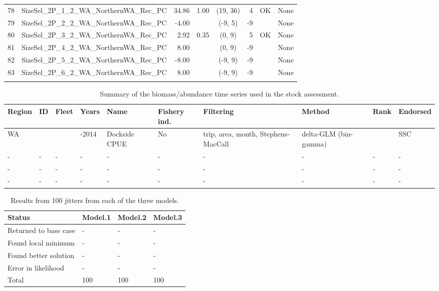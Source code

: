 \documentclass[12pt,]{article}
\begin{document}
\begin{landscape}
\begin{longtable}{rlrrcrcl}
  78 & SizeSel\_2P\_1\_2\_WA\_NorthernWA\_Rec\_PC & 34.86 & 1.00 & (19, 36) & 4 & OK & None \\ 
  79 & SizeSel\_2P\_2\_2\_WA\_NorthernWA\_Rec\_PC & -4.00 &  & (-9, 5) & -9 &  & None \\ 
  80 & SizeSel\_2P\_3\_2\_WA\_NorthernWA\_Rec\_PC & 2.92 & 0.35 & (0, 9) & 5 & OK & None \\ 
  81 & SizeSel\_2P\_4\_2\_WA\_NorthernWA\_Rec\_PC & 8.00 &  & (0, 9) & -9 &  & None \\ 
  82 & SizeSel\_2P\_5\_2\_WA\_NorthernWA\_Rec\_PC & -8.00 &  & (-9, 9) & -9 &  & None \\ 
  83 & SizeSel\_2P\_6\_2\_WA\_NorthernWA\_Rec\_PC & 8.00 &  & (-9, 9) & -9 &  & None \\ 
   \hline
\hline
\label{tab:model_params}
\end{longtable}
\end{landscape}

\newpage

\begin{table}[ht]
\centering
\caption{Summary of the biomass/abundance
                                              time series used in the stock
                                              assessment.} 
\label{tab:Index_summary}
\begin{tabular}{>{\centering}p{.4in}>{\centering}p{.3in}>{\centering}p{.3in}>{\centering}p{.3in}>{\centering}p{.6in}>{\centering}p{.5in}>{\centering}p{.8in}>{\centering}p{.8in}>{\centering}p{.3in}>{\centering}p{.5in}}
  \hline
Region & ID & Fleet & Years & Name & Fishery ind. & Filtering & Method & Rank & Endorsed \\ 
  \hline
WA & 1 & 4 & 1981-2014 & Dockside CPUE & No & trip, area, month, Stephens-MacCall & delta-GLM (bin-gamma) & 1 & SSC \\ 
  - & - & - & - & - & - & - & - & - & - \\ 
  - & - & - & - & - & - & - & - & - & - \\ 
  - & - & - & - & - & - & - & - & - & - \\ 
   \hline
\end{tabular}
\end{table}

\newpage

\begin{table}[ht]
\centering
\caption{Results from 100 jitters from each of 
                                      the three models.} 
\label{tab:jitter}
\begin{tabular}{llll}
  \hline
Status & Model.1 & Model.2 & Model.3 \\ 
  \hline
Returned to base case & - & - & - \\ 
  Found local minimum & - & - & - \\ 
  Found better solution & - & - & - \\ 
  Error in likelihood & - & - & - \\ 
  Total & 100 & 100 & 100 \\ 
   \hline
\end{tabular}
\end{table}
\end{document}
